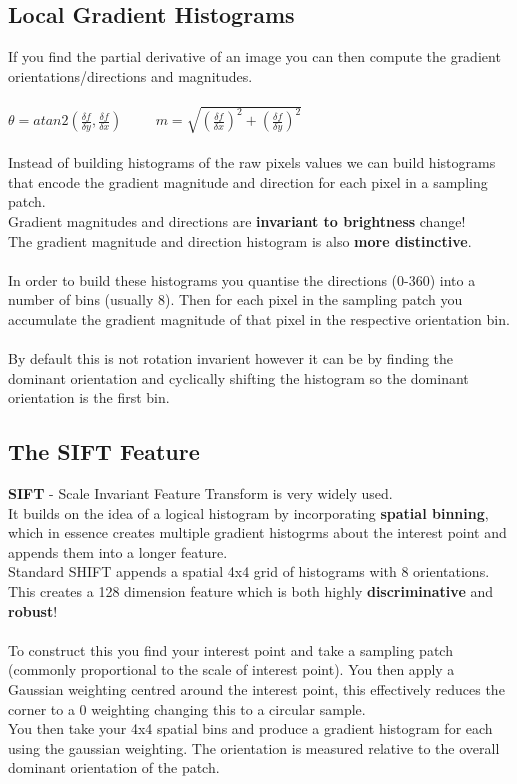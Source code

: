 \documentclass{article}
\begin{document}
	\subsection*{Local Gradient Histograms}
	If you find the partial derivative of an image you can then compute the gradient orientations/directions and magnitudes.\\
	\\
	\begin{math}
	\theta = atan2(\frac{\delta f}{\delta y},\frac{\delta f}{\delta x}) \hspace{1cm}
	m = \sqrt{(\frac{\delta f}{\delta x})^2 + (\frac{\delta f}{\delta y})^2}
	\end{math}
	\\
	\\
	Instead of building histograms of the raw pixels values we can build histograms that encode the gradient magnitude and direction for each pixel in a sampling patch.\\
	Gradient magnitudes and directions are {\bfseries invariant to brightness} change!\\
	The gradient magnitude and direction histogram is also {\bfseries more distinctive}.\\
	\\
	In order to build these histograms you quantise the directions (0-360) into a number of bins (usually 8). Then for each pixel in the sampling patch you accumulate the gradient magnitude of that pixel in the respective orientation bin.\\
	\\By default this is not rotation invarient however it can be by finding the dominant orientation and cyclically shifting the histogram so the dominant orientation is the first bin.
	
	\subsection*{The SIFT Feature}
	{\bfseries SIFT} - Scale Invariant Feature Transform is very widely used.\\
	It builds on the idea of a logical histogram by incorporating {\bfseries spatial binning}, which in essence creates multiple gradient histogrms about the interest point and appends them into a longer feature.\\
	Standard SHIFT appends a spatial 4x4 grid of histograms with 8 orientations. This creates a 128 dimension feature which is both highly {\bfseries discriminative} and {\bfseries robust}!\\
	\\To construct this you find your interest point and take a sampling patch (commonly proportional to the scale of interest point). You then apply a Gaussian weighting centred around the interest point, this effectively reduces the corner to a 0 weighting changing this to a circular sample.\\
	You then take your 4x4 spatial bins and produce a gradient histogram for each using the gaussian weighting. The orientation is measured relative to the overall dominant orientation of the patch.
	
\end{document}
